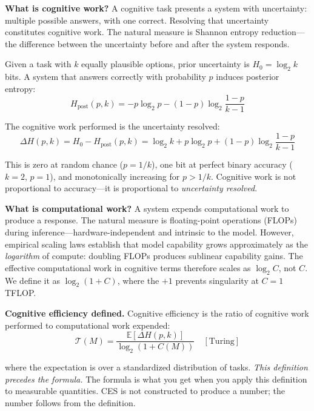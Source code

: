 \documentclass[12pt]{article}
\begin{document}
\textbf{What is cognitive work?} A cognitive task presents a system with uncertainty: multiple possible answers, with one correct. Resolving that uncertainty constitutes cognitive work. The natural measure is Shannon entropy reduction---the difference between the uncertainty before and after the system responds.

Given a task with $k$ equally plausible options, prior uncertainty is $H_0 = \log_2 k$ bits. A system that answers correctly with probability $p$ induces posterior entropy:
\begin{equation}
H_{\text{post}}(p, k) = -p\log_2 p - (1-p)\log_2\frac{1-p}{k-1}
\end{equation}

The cognitive work performed is the uncertainty resolved:
\begin{equation}
\Delta H(p, k) = H_0 - H_{\text{post}}(p, k) = \log_2 k + p\log_2 p + (1-p)\log_2\frac{1-p}{k-1}
\end{equation}

This is zero at random chance ($p = 1/k$), one bit at perfect binary accuracy ($k=2$, $p=1$), and monotonically increasing for $p > 1/k$. Cognitive work is not proportional to accuracy---it is proportional to \textit{uncertainty resolved}.

\textbf{What is computational work?} A system expends computational work to produce a response. The natural measure is floating-point operations (FLOPs) during inference---hardware-independent and intrinsic to the model. However, empirical scaling laws \cite{kaplan2020, hoffmann2022} establish that model capability grows approximately as the \textit{logarithm} of compute: doubling FLOPs produces sublinear capability gains. The effective computational work in cognitive terms therefore scales as $\log_2 C$, not $C$. We define it as $\log_2(1 + C)$, where the $+1$ prevents singularity at $C = 1$ TFLOP.

\textbf{Cognitive efficiency defined.} Cognitive efficiency is the ratio of cognitive work performed to computational work expended:
\begin{equation}
\mathcal{T}(M) = \frac{\mathbb{E}[\Delta H(p, k)]}{\log_2(1 + C(M))} \quad [\mathrm{Turing}]
\end{equation}

where the expectation is over a standardized distribution of tasks. \textit{This definition precedes the formula.} The formula is what you get when you apply this definition to measurable quantities. CES is not constructed to produce a number; the number follows from the definition.
\end{document}
